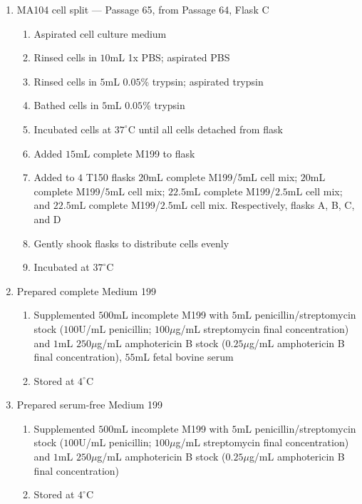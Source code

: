 \begin{enumerate}
	\item MA104 cell split --- Passage 65, from Passage 64, Flask C
		\begin{enumerate}
			\item Aspirated cell culture medium
			\item Rinsed cells in $10$mL 1x PBS; aspirated PBS
			\item Rinsed cells in $5$mL $0.05$\% trypsin; aspirated trypsin
			\item Bathed cells in $5$mL $0.05$\% trypsin
			\item Incubated cells at $37^{\circ}$C until all cells detached from flask
			\item Added $15$mL complete M199 to flask
			\item Added to $4$ T150 flasks $20$mL complete M199/$5$mL cell mix; $20$mL complete M199/$5$mL cell mix; $22.5$mL complete M199/$2.5$mL cell mix; and $22.5$mL complete M199/$2.5$mL cell mix. Respectively, flasks A, B, C, and D
			\item Gently shook flasks to distribute cells evenly
			\item Incubated at $37^{\circ}$C
		\end{enumerate}
	\item Prepared complete Medium 199
		\begin{enumerate}
				\item Supplemented $500$mL incomplete M199 with $5$mL penicillin/streptomycin stock ($100$U/mL penicillin; $100\mu$g/mL streptomycin final concentration) and $1$mL $250\mu$g/mL amphotericin B stock ($0.25\mu$g/mL amphotericin B final concentration), $55$mL fetal bovine serum
				\item Stored at $4^{\circ}$C
		\end{enumerate}
	\item Prepared serum-free Medium 199
		\begin{enumerate}
			\item Supplemented $500$mL incomplete M199 with $5$mL penicillin/streptomycin stock ($100$U/mL penicillin; $100\mu$g/mL streptomycin final concentration) and $1$mL $250\mu$g/mL amphotericin B stock ($0.25\mu$g/mL amphotericin B final concentration)
			\item Stored at $4^{\circ}$C
		\end{enumerate}
\end{enumerate}

